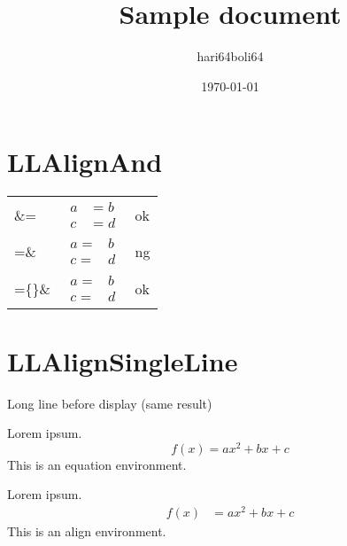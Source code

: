 \documentclass[a4paper, 10pt]{article}
\newcommand{\tA}[1]{\textcolor{cA}{#1}}
\newcommand{\tD}[1]{\textcolor{cD}{#1}}
\begin{document}
\title{Sample document}
\author{hari64boli64}
\date{\today}
\maketitle

\section{LLAlignAnd}

\begin{table}[H]
	\centering
	\begin{tabular}{lll}
		\&=              &
		$\begin{aligned}
				 a & = b \\
				 c & = d
			 \end{aligned}$ &
		\tA{ok}            \\[0.3cm]
		=\&              &
		$\begin{aligned}
				 a = & b \\
				 c = & d
			 \end{aligned}$ &
		\tD{ng}            \\[0.3cm]
		=\{\}\&          &
		$\begin{aligned}
				 a = {} & b \\
				 c = {} & d
			 \end{aligned}$ &
		\tA{ok}
	\end{tabular}
\end{table}

\section{LLAlignSingleLine}

\begin{itembox}{\large Long line before display (same result)}
	\begin{minipage}[t]{.5\columnwidth}
		Lorem ipsum.
		\begin{equation*}
			f(x) = ax^2 + bx + c
		\end{equation*}
		This is an \tA{equation} environment.
	\end{minipage}%
	\begin{minipage}[t]{.5\columnwidth}
		Lorem ipsum.
		\begin{align*}
			f(x) & = ax^2 + bx + c
		\end{align*}
		This is an \tD{align} environment.
	\end{minipage}
\end{itembox}
\end{document}
